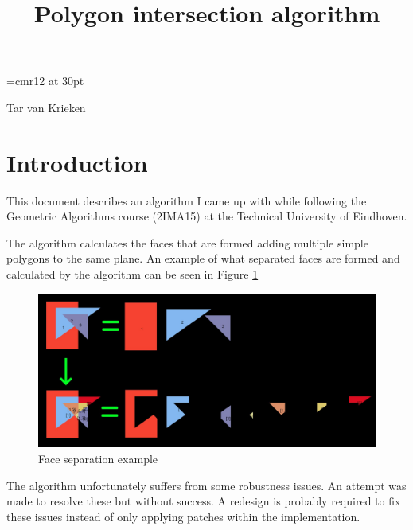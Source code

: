 \documentclass[12pt]{article}
\begin{document}

\begin{center}
\font\myfont=cmr12 at 30pt
\title*{\myfont Polygon intersection algorithm}
\end{center}

\begin{center}
Tar van Krieken
\end{center}

\vspace{8mm}

\section*{Introduction}
This document describes an algorithm I came up with while following the Geometric Algorithms course (2IMA15) at the Technical University of Eindhoven.

The algorithm calculates the faces that are formed adding multiple simple polygons to the same plane. An example of what separated faces are formed and calculated by the algorithm can be seen in Figure \ref{fig:intersectionExample}

\begin{figure}[!htb]
  \includegraphics[width=\linewidth]{Images/intersectionExample.jpg}
  \caption{Face separation example}
  \label{fig:intersectionExample}
\end{figure}

The algorithm unfortunately suffers from some robustness issues. An attempt was made to resolve these but without success. A redesign is probably required to fix these issues instead of only applying patches within the implementation. 
\end{document}
